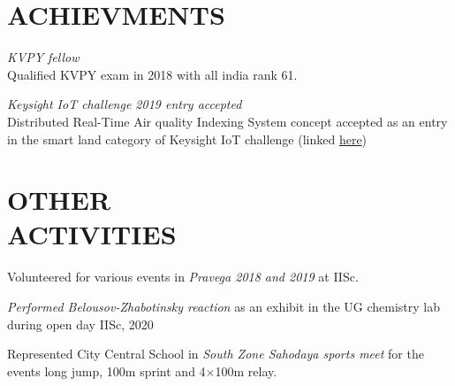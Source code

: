 \documentclass[margin, 10pt]{res} %
\begin{document}
\begin{resume}

\section{ACHIEVMENTS}

{\sl KVPY fellow}\\
Qualified KVPY exam in 2018 with all india rank 61.

{\sl Keysight IoT challenge 2019 entry accepted}\\
Distributed Real-Time Air quality Indexing System concept accepted
as an entry in the smart land category of Keysight IoT challenge (linked \href{https://www.iotchallengekeysight.com/2019/entries/smart-land/41-0413-102730-draqis-distributed-real-time-air-quality-indexing-system}{here})



\section{OTHER \\ ACTIVITIES} 
Volunteered for various events in {\it Pravega 2018 and 2019} at IISc.
\smallskip

{\it Performed Belousov-Zhabotinsky reaction} as an exhibit in the UG chemistry lab during open day IISc, 2020
\smallskip

Represented City Central School in {\it South Zone Sahodaya sports meet} for the events
long jump, 100m sprint and 4$\times$100m relay.


\end{resume}
\end{document}
